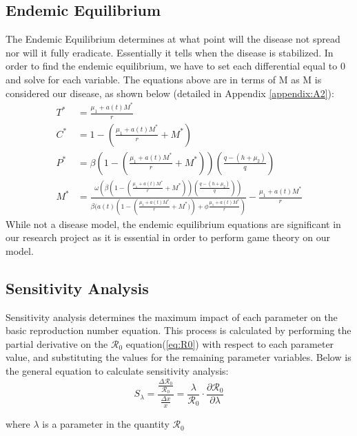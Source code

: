 \documentclass[12pt]{article}
\begin{document}
\subsection{Endemic Equilibrium}
The Endemic Equilibrium determines at what point will the disease not spread nor will it fully eradicate. Essentially it tells when the disease is stabilized. In order to find the endemic equilibrium, we have to set each differential equal to 0 and solve for each variable. The equations above are in terms of M as M is considered our disease, as shown below (detailed in Appendix \ref{appendix:A2}):
\begin{align}
        T^{*} &= \frac{\mu_{1} + a(t)M^{*}}{r} \label{eq:T*}\\
        C^{*} %
        &= 1- \left(\frac{\mu_{1} + a(t)M^{*}}{r} + M^{*} \right) \label{eq:C*}\\
        P^{*} %
        &= \beta \left(1- \left(\frac{\mu_{1} + a(t)M^{*}}{r} + M^{*} \right) \right) \left(\frac{q-(h+\mu_{2})}{q} \right) \label{eq:P*}\\
        M^{*} &= \frac{\omega (\beta \left(1- \left(\frac{\mu_{1} + a(t)M^{*}}{r} + M^{*} \right) \right) \left(\frac{q-(h+\mu_{2})}{q} \right))}{\beta(a(t)(1- \left(\frac{\mu_{1} + a(t)M^{*}}{r} + M^{*}) \right)+\phi \frac{\mu_{1} + a(t)M^{*}}{r})} - \frac{\mu_{1} + a(t)M^{*}}{r} \label{eq:M*}
\end{align}
While not a disease model, the endemic equilibrium equations are significant in our research project as it is essential in order to perform game theory on our model. 

\subsection{Sensitivity Analysis}
Sensitivity analysis determines the maximum impact of each parameter on the basic reproduction number equation. This process is calculated by performing the partial derivative on the $\mathscr{R}_0$ equation(\ref{eq:R0}) with respect to each parameter value, and substituting the values for the remaining parameter variables. Below is the general equation to calculate sensitivity analysis: \\
\begin{equation}\label{eq:sens_analysis}
        S_{\lambda} = \frac{\frac{\Delta \mathscr{R}_{0}}{\mathscr{R}_{0}}}{\frac{\Delta x}{x}} = \frac{\lambda}{\mathscr{R}_{0}} \cdot \frac{\partial \mathscr{R}_{0}}{\partial \lambda}
\end{equation}
\begin{center}
    where $\lambda$ is a parameter in the quantity $\mathscr{R}_{0}$
\end{center}
\end{document}
